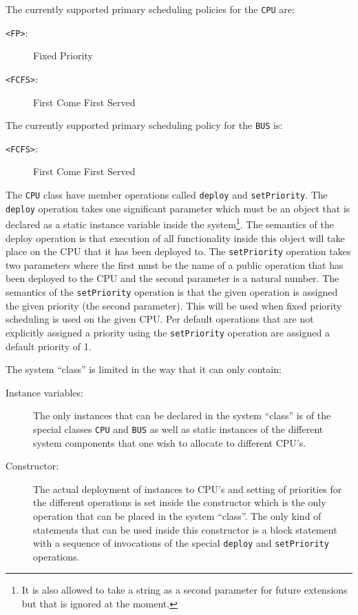 \documentclass{overturerepchap}
\begin{document}
\begin{description}
The currently supported primary scheduling policies for the \texttt{CPU}
are:
\begin{description}
\item[\texttt{<FP>}:] Fixed Priority
\item[\texttt{<FCFS>}:] First Come First Served
\end{description} 

The currently supported primary scheduling policy for the \texttt{BUS}
is:
\begin{description}
\item[\texttt{<FCFS>}:] First Come First Served
\end{description} 

The \texttt{CPU} class have member operations called \texttt{deploy} and
\texttt{setPriority}. The \texttt{deploy} operation takes one
significant parameter
which must be an object that is declared as a static instance variable
inside the system\footnote{It is also allowed to take a string as a
second parameter for future extensions but that is ignored at the
moment.}. The semantics of the deploy operation is that execution
of all functionality inside this object will take place on the CPU that it
has been deployed to. The \texttt{setPriority} operation takes two 
parameters where the first must be the name of a public operation that 
has been deployed to the CPU and the second parameter is a natural number.
The semantics of the \texttt{setPriority} operation is that the given 
operation is assigned the given priority (the second parameter). This will
be used when fixed priority scheduling is used on the given CPU. Per
default operations that are not explicitly assigned a priority using
the \texttt{setPriority} operation are assigned a default priority of 1.

The system ``class'' is limited in the way that it can only contain:
\begin{description}
\item[Instance variables:] The only instances that can be declared in the 
system ``class'' is of the special classes \texttt{CPU} and \texttt{BUS} 
as well as static instances of the different system components that one 
wish to allocate to different CPU's.
\item[Constructor:] The actual deployment of instances to CPU's and setting
of priorities for the different operations is set inside the
constructor which is the only operation that can be placed in the
system ``class''. The only kind of statements that can be used inside
this constructor is a block statement with a sequence of invocations
of the special \texttt{deploy} and \texttt{setPriority} operations.
\end{description}


\end{description}
\end{document}
